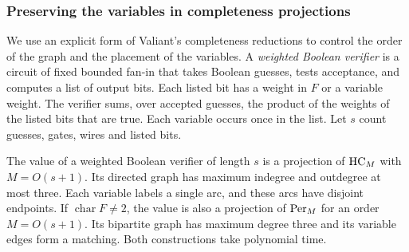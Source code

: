 \subsubsection{Preserving the variables in completeness projections}\label{sec:gadgets}

We use an explicit form of Valiant's completeness reductions
\cite{Valiant} to control the order of the graph and the placement of
the variables. A \emph{weighted Boolean verifier} is a circuit of fixed
bounded fan-in that takes Boolean guesses, tests acceptance, and computes
a list of output bits. Each listed bit has a weight in $F$ or a variable
weight. The verifier sums, over accepted guesses, the product of the
weights of the listed bits that are true. Each variable occurs once in
the list. Let $s$ count guesses, gates, wires and listed bits.

\begin{lemma}\label{gadget:verifier}
The value of a weighted Boolean verifier of length $s$ is a projection
of $\mathrm{HC}_M$ with $M=O(s+1)$. Its directed graph has maximum indegree
and outdegree at most three. Each variable labels a single arc, and
these arcs have disjoint endpoints. If $\operatorname{char} F\ne2$,
the value is also a projection of $\mathrm{Per}_M$ for an order $M=O(s+1)$.
Its bipartite graph has maximum degree three and its variable edges
form a matching. Both constructions take polynomial time.
\end{lemma}

